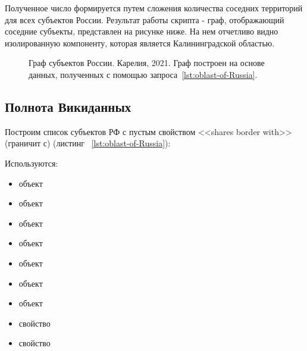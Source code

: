 Полученное число формируется путем сложения количества соседних территорий для всех субъектов России. Результат работы скрипта - граф, отображающий соседние субъекты, представлен на рисунке ниже. На нем отчетливо видно изолированную компоненту, которая является Калининградской областью.

\begin{figure*}[h]

    \setlength{\fboxsep}{0pt}%
    \setlength{\fboxrule}{1pt}%
	\caption[Граф субъектов России. Карелия, 2021.]{Граф субъектов России. Карелия, 2021. Граф построен на основе данных, полученных с помощью запроса~\protect\ref{lst:oblast-of-Russia}.}%
\end{figure*} 

\subsection{Полнота Викиданных}

Построим список субъектов РФ с пустым свойством <<shares border with>> (граничит с) (листинг ~\protect\ref{lst:oblast-of-Russia}):

Используются:
\begin{itemize}
  \item объект 
  \item объект 
  \item объект 
  \item объект 
  \item объект 
  \item объект 
  \item объект 
  \item свойство 
  \item свойство 
\end{itemize}

